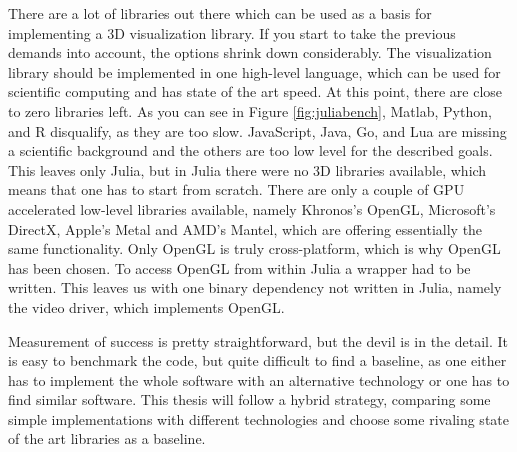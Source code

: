 There are a lot of libraries out there which can be used as a basis for implementing a 3D visualization library.
If you start to take the previous demands into account, the options shrink down considerably.
The visualization library should be implemented in one high-level language, which can be used for scientific computing and has state of the art speed. 
At this point, there are close to zero libraries left. As you can see in Figure \ref{fig:juliabench}, Matlab, Python, and R disqualify, as they are too slow. JavaScript, Java, Go, and Lua are missing a scientific background and the others are too low level for the described goals.
This leaves only Julia, but in Julia there were no 3D libraries available, which means that one has to start from scratch.
There are only a couple of GPU accelerated low-level libraries available, namely Khronos's \ac{OpenGL}, Microsoft's DirectX, Apple's Metal and AMD's Mantel, which are offering essentially the same functionality. 
Only \ac{OpenGL} is truly cross-platform, which is why \ac{OpenGL} has been chosen.
To access \ac{OpenGL} from within Julia a wrapper had to be written. 
This leaves us with one binary dependency not written in Julia, namely the video driver, which implements \ac{OpenGL}.

Measurement of success is pretty straightforward, but the devil is in the detail.
It is easy to benchmark the code, but quite difficult to find a baseline, as one either has to implement the whole software with an alternative technology or one has to find similar software.
This thesis will follow a hybrid strategy, comparing some simple implementations with different technologies and choose some rivaling state of the art libraries as a baseline.

